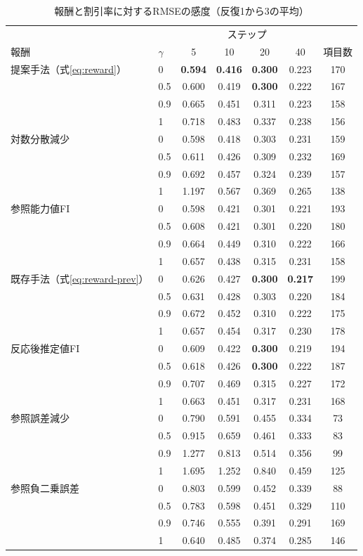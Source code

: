 \documentclass[paper]{ieicej}
\begin{document}
\begin{table}[t]
\centering
\caption{報酬と割引率に対するRMSEの感度（反復1から3の平均）}
\label{tab:sensitivity}
\footnotesize
\setlength{\tabcolsep}{3pt}
\begin{tabular}{llccccc}
\hline
 & & \multicolumn{4}{c}{ステップ} & \\
報酬 & $\gamma$ & 5 & 10 & 20 & 40 & 項目数\\
\hline
提案手法（式\eqref{eq:reward}） & 0 & \textbf{0.594} & \textbf{0.416} & \textbf{0.300} & 0.223 & 170\\
 & 0.5 & 0.600 & 0.419 & \textbf{0.300} & 0.222 & 167\\
 & 0.9 & 0.665 & 0.451 & 0.311 & 0.223 & 158\\
 & 1 & 0.718 & 0.483 & 0.337 & 0.238 & 156\\
\hline
対数分散減少 & 0 & 0.598 & 0.418 & 0.303 & 0.231 & 159\\
 & 0.5 & 0.611 & 0.426 & 0.309 & 0.232 & 169\\
 & 0.9 & 0.692 & 0.457 & 0.324 & 0.239 & 157\\
 & 1 & 1.197 & 0.567 & 0.369 & 0.265 & 138\\
\hline
参照能力値FI & 0 & 0.598 & 0.421 & 0.301 & 0.221 & 193\\
 & 0.5 & 0.608 & 0.421 & 0.301 & 0.220 & 180\\
 & 0.9 & 0.664 & 0.449 & 0.310 & 0.222 & 166\\
 & 1 & 0.657 & 0.438 & 0.315 & 0.231 & 158\\
\hline
既存手法（式\eqref{eq:reward-prev}） & 0 & 0.626 & 0.427 & \textbf{0.300} & \textbf{0.217} & 199\\
 & 0.5 & 0.631 & 0.428 & 0.303 & 0.220 & 184\\
 & 0.9 & 0.672 & 0.452 & 0.310 & 0.222 & 175\\
 & 1 & 0.657 & 0.454 & 0.317 & 0.230 & 178\\
\hline
反応後推定値FI & 0 & 0.609 & 0.422 & \textbf{0.300} & 0.219 & 194\\
 & 0.5 & 0.618 & 0.426 & \textbf{0.300} & 0.222 & 187\\
 & 0.9 & 0.707 & 0.469 & 0.315 & 0.227 & 172\\
 & 1 & 0.663 & 0.451 & 0.317 & 0.231 & 168\\
\hline
参照誤差減少 & 0 & 0.790 & 0.591 & 0.455 & 0.334 & 73\\
 & 0.5 & 0.915 & 0.659 & 0.461 & 0.333 & 83\\
 & 0.9 & 1.277 & 0.813 & 0.514 & 0.356 & 99\\
 & 1 & 1.695 & 1.252 & 0.840 & 0.459 & 125\\
\hline
参照負二乗誤差 & 0 & 0.803 & 0.599 & 0.452 & 0.339 & 88\\
 & 0.5 & 0.783 & 0.598 & 0.451 & 0.329 & 110\\
 & 0.9 & 0.746 & 0.555 & 0.391 & 0.291 & 169\\
 & 1 & 0.640 & 0.485 & 0.374 & 0.285 & 146\\
\hline
\end{tabular}
\end{table}
\end{document}
